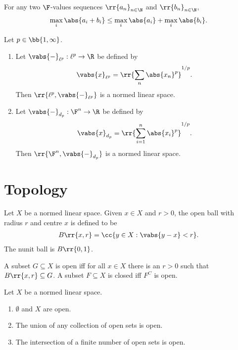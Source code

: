 \documentclass{article}
\begin{document}
\begin{theorem}
	\label{thm:minkowski-for-p-infinite}
	For any two $\F$-values sequences $ \rr{a_n}_{n\in\N}$ and $ \rr{b_n}_{n\in\N}$,
	\begin{align*}
		\max_i \abs{ a_i + b_i } \leq \max_i \abs{ a_i } + \max_i \abs{ b_i }.
	\end{align*}
\end{theorem}

\begin{theorem}
	\label{thm:dl-norms}
	Let $p\in \bb{ 1,\infty }$.
	\begin{enumerate}
		\item Let $ \vabs{ - }_{ \ell^p } : \ell^p \to \R$ be defined by \begin{align*}
			      \vabs{ x }_{ \ell^p } = \rr{ \sum_{ n }^{  } \abs{ x_n }^p }^{1/p}.
		      \end{align*}
		      Then $ \rr{ \ell^p, \vabs{ - }_{ \ell^p } }$ is a normed linear space.
		\item Let $ \vabs{ - }_{ d_p } : \F^n \to \R$ be defined by \begin{align*}
			      \vabs{ x }_{ d_p } = \rr{ \sum_{ i=1 }^{ n } \abs{ x_i }^p }^{1/p}.
		      \end{align*}
		      Then $ \rr{ \F^n, \vabs{ - }_{ d_p } } $ is a normed linear space.
	\end{enumerate}
\end{theorem}

\section{Topology} \label{sec:topology}

\begin{definition}
	\label{def:open}
	Let $X$ be a normed linear space. Given $x\in X$ and $r>0$, the open ball with radius
	$r$ and centre $x$ is defined to be
	\begin{align*}
		B\rr{x,r}=\cc{y\in X:\vabs{y-x}<r}.
	\end{align*}
	The nunit ball is $B\rr{0,1}$.

	A subset $G\subseteq X$ is open iff for all $x\in X$ there is an $r>0$ such that
	$B\rr{x,r}\subseteq G$. A subset $F\subseteq X$ is closed iff $F^C$ is open.
\end{definition}

\begin{theorem}
	Let $X$ be a normed linear space.
	\begin{enumerate}
		\item $\emptyset$ and $X$ are open.
		\item The union of any collection of open sets is open.
		\item The intersection of a finite number of open sets is open.
	\end{enumerate}
\end{theorem}
\end{document}
